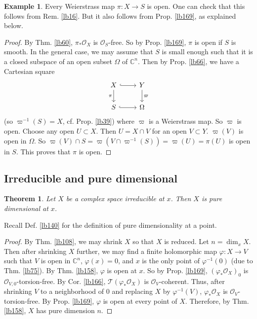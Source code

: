\documentclass[12pt,b5paper,notitlepage]{report}
\theoremstyle{definition}
\newtheorem{eg}[df]{Example}
\theoremstyle{plain}
\newtheorem{thm}[df]{Theorem}
\newcommand{\scr}{\mathscr}
\newcommand{\Cbb}{\mathbb C}
\numberwithin{equation}{section}
\begin{document}
\begin{eg}\label{lb205}
Every Weierstrass map $\pi:X\rightarrow S$ is open. One can check that this follows from Rem. \ref{lb16}. But it also follows from Prop. \ref{lb169}, as explained below.
\end{eg}

\begin{proof}
By Thm. \ref{lb60}, $\pi_*\scr O_X$ is $\scr O_S$-free. So by Prop. \ref{lb169}, $\pi$ is open if $S$ is smooth. In the general case, we may assume that $S$ is small enough such that it is a closed subspace of an open subset $\Omega$ of $\Cbb^n$. Then by Prop. \ref{lb66}, we have a Cartesian square
\begin{equation}
\begin{tikzcd}
X \arrow[r, hook] \arrow[d, "\pi"'] & Y \arrow[d, "\varpi"] \\
S \arrow[r, hook]                   & \Omega               
\end{tikzcd}
\end{equation} 
(so $\varpi^{-1}(S)=X$, cf. Prop. \ref{lb39}) where $\varpi$ is a Weierstrass map. So $\varpi$ is open. Choose any open $U\subset X$. Then $U=X\cap V$ for an open $V\subset Y$. $\varpi(V)$ is open in $\Omega$. So $\varpi(V)\cap S=\varpi(V\cap \varpi^{-1}(S))=\varpi(U)=\pi(U)$ is open in $S$. This proves that $\pi$ is open.
\end{proof}



\subsection{Irreducible and pure dimensional}

\begin{thm}\label{lb170}
Let $X$ be a complex space irreducible at $x$. Then $X$ is pure dimensional at $x$.
\end{thm}


Recall Def. \ref{lb140} for the definition of pure dimensionality at a point.


\begin{proof}
By Thm. \ref{lb108}, we may shrink $X$ so that $X$ is reduced. Let $n=\dim_xX$. Then after shrinking $X$ further, we may find a finite holomorphic map $\varphi:X\rightarrow V$ such that $V$ is open in $\Cbb^n$, $\varphi(x)=0$, and $x$ is the only point of $\varphi^{-1}(0)$ (due to Thm. \ref{lb75}). By Thm. \ref{lb158}, $\varphi$ is open at $x$. So by Prop. \ref{lb169}, $(\varphi_*\scr O_X)_0$ is $\scr O_{V,0}$-torsion-free.  By Cor. \ref{lb166}, $\scr T(\varphi_*\scr O_X)$ is $\scr O_V$-coherent. Thus, after shrinking $V$ to a neighborhood of $0$ and replacing $X$ by $\varphi^{-1}(V)$, $\varphi_*\scr O_X$ is $\scr O_V$-torsion-free. By Prop. \ref{lb169}, $\varphi$ is open at every point of $X$. Therefore, by Thm. \ref{lb158}, $X$ has pure dimension $n$. 
\end{proof}
\end{document}
